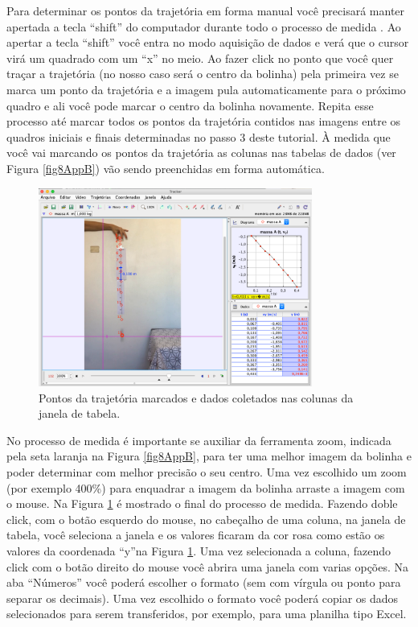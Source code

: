 \documentclass[12pt]{article}
\begin{document}
Para determinar os pontos da trajetória em forma manual você precisará manter 
apertada a tecla ``shift'' do computador durante todo o processo de medida . Ao apertar a tecla ``shift'' você entra no modo aquisição de dados e verá que o cursor virá um quadrado com um ``x'' no meio.
Ao fazer click no ponto que você quer traçar a trajetória (no nosso caso será o centro da bolinha)
pela primeira vez se marca um ponto da trajetória e a imagem pula automaticamente para o próximo quadro e ali você pode marcar o centro da bolinha novamente. Repita esse processo até marcar todos os pontos da trajetória contidos nas imagens entre os quadros iniciais e finais determinadas no passo 3 deste tutorial. À medida que você vai marcando os pontos da trajetória as colunas nas tabelas de dados (ver Figura \ref{fig8AppB}) vão sendo preenchidas em forma automática.
\begin{figure}[h!]
\includegraphics[width=9cm]{fig9AppB.pdf}
\caption{Pontos da trajetória marcados e dados coletados nas colunas da janela de tabela.}
\label{fig9AppB}
\end{figure}
No processo de medida é importante se auxiliar da ferramenta zoom, indicada pela seta laranja na 
Figura \ref{fig8AppB}, para ter uma melhor imagem da bolinha e poder determinar com melhor precisão o seu centro. Uma vez escolhido um zoom (por exemplo 400\%) para enquadrar a imagem 
da bolinha arraste a imagem com o mouse. Na Figura \ref{fig9AppB} é mostrado 
o final do processo de medida. Fazendo doble click, com o botão esquerdo do mouse, no cabeçalho de uma coluna, na janela de tabela, você seleciona a janela e os valores ficaram da cor rosa como estão os valores da coordenada ``y''na Figura \ref{fig9AppB}. Uma vez selecionada a 
coluna, fazendo click com o botão direito do mouse você abrira uma janela com varias opções.
Na aba ``Números'' você poderá escolher o formato (sem com vírgula ou ponto para separar os decimais). Uma vez escolhido o formato você poderá copiar os dados selecionados para serem transferidos, por exemplo, para uma planilha tipo Excel. 
 
\end{document}

